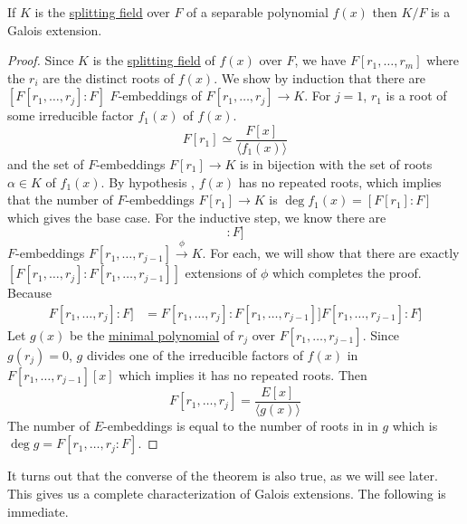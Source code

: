   \begin{theorem}
    \label{thm:splitting_separable}
    If $K$ is the \hyperref[def:splitting-field]{splitting field} over $F$ of a separable polynomial $f(x)$ then $K/F$ is a Galois extension. 
  \end{theorem}
  \begin{proof}
    Since $K$ is the \hyperref[def:splitting-field]{splitting field} of $f(x)$ over $F$, we have $F[r_1, \ldots, r_m]$ where the $r_i$ are the distinct roots of $f(x)$. We show by induction that there are $[F[r_1, \ldots, r_j]:F]$ $F$-embeddings of $F[r_1, \ldots, r_j] \to K$. For $j = 1$, $r_1$ is a root of some irreducible factor $f_1 (x)$ of $f(x)$. 
    \begin{equation}
      F[r_1] \simeq \frac{F[x]}{\langle f_1 (x) \rangle}
    \end{equation} 
    and the set of $F$-embeddings $F[r_1] \to K$ is in bijection with the set of roots $\alpha \in K$ of $f_1 (x)$. By hypothesis , $f(x)$ has no repeated roots, which implies that the number of $F$-embeddings $F[r_1] \to K$ is $\deg{f_1 (x)} = [F[r_1]: F]$ which gives the base case. For the inductive step, we know there are 
    \begin{equation}
      [F[r_1, \ldots, r_{j-1}]: F] 
    \end{equation}
    $F$-embeddings $F[r_1, \ldots, r_{j-1}] \xrightarrow{\phi} K$. For each, we will show that there are exactly $[F[r_1, \ldots, r_j]: F[r_1, \ldots, r_{j-1}]]$ extensions of $\phi$ which completes the proof. Because 
    \begin{align}
      F[r_1, \ldots, r_j]: F] & = F[r_1, \ldots, r_j]: F[r_1, \ldots, r_{j-1}]] F[r_1, \ldots, r_{j-1}]: F]
    \end{align} 
    Let $g(x)$ be the \hyperref[def:min_poly]{minimal polynomial} of $r_j$ over $F[r_1, \ldots, r_{j-1}]$. Since $g(r_j) = 0$, $g$ divides one of the irreducible factors of $f(x)$ in $F[r_1, \ldots, r_{j-1}] [x]$ which implies it has no repeated roots. Then 
    \begin{equation}
      F[r_1, \ldots, r_j] = \frac{E[x]}{\langle g(x)\rangle} 
    \end{equation}
    The number of $E$-embeddings is equal to the number of roots in in $g$ which is $\deg{g} = F[r_1, \ldots, r_j: F]$.
  \end{proof} 

  It turns out that the converse of the theorem is also true, as we will see later. This gives us a complete characterization of Galois extensions. The following is immediate. 

